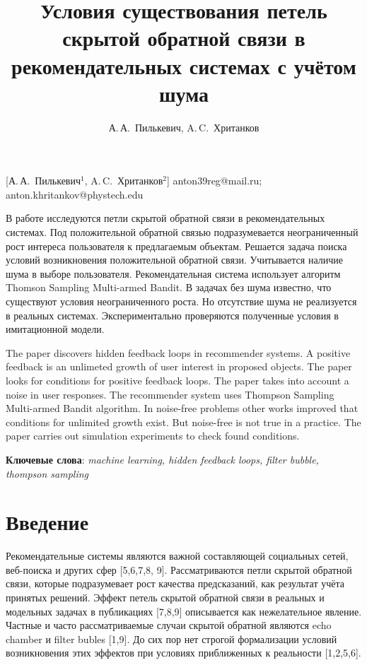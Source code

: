 \documentclass[12pt, twoside]{article}
\begin{document}
\title
    [] %
    {Условия существования петель скрытой обратной связи в рекомендательных системах с учётом шума}
\author
    [А.\,А.~Пилькевич] %
    {А.\,А.~Пилькевич, A.\,C.~Хританков} %
    [А.\,А.~Пилькевич$^1$, A.\,C.~Хританков$^2$] %
\email
   {anton39reg@mail.ru; anton.khritankov@phystech.edu}
\abstract
  {В работе исследуются петли скрытой обратной связи в рекомендательных системах.
  Под положительной обратной связью подразумевается неограниченный рост интереса пользователя к предлагаемым объектам. 
  Решается задача поиска условий возникновения положительной обратной связи. 
  Учитывается наличие шума в выборе пользователя.
  Рекомендательная система использует алгоритм Thomson Sampling Multi-armed Bandit.
  В задачах без шума известно, что существуют условия неограниченного роста. 
  Но отсутствие шума не реализуется в реальных системах.
  Экспериментально проверяются полученные условия в имитационной модели.

\bigskip
  The paper discovers hidden feedback loops in recommender systems. 
  A positive feedback is an unlimeted growth of user interest in proposed objects.
  The paper looks for conditions for positive feedback loops. 
  The paper takes into account a noise in user responses.
  The recommender system uses Thompson Sampling Multi-armed Bandit algorithm.
  In noise-free problems other works improved that conditions for unlimited growth exist.
  But noise-free is not true in a practice.
  The paper carries out simulation experiments to check found conditions.

\bigskip
\noindent
\textbf{Ключевые слова}: \emph {machine learning, hidden feedback loops, filter bubble, thompson sampling}
}
\doi{}
\receivedRus{}
\receivedEng{}

\maketitle
\linenumbers
\section{Введение}
Рекомендательные системы являются важной составляющей социальных сетей, веб-поиска и других сфер [5,6,7,8, 9]. 
Рассматриваются петли скрытой обратной связи, которые подразумевает рост качества предсказаний, как результат учёта принятых решений. 
Эффект петель скрытой обратной связи в реальных и модельных задачах в  публикациях [7,8,9] описывается как нежелательное явление. 
Частные и часто рассматриваемые случаи скрытой обратной являются echo chamber и filter bubles [1,9].
До сих пор нет строгой формализации условий возникновения этих эффектов при условиях приближенных к реальности [1,2,5,6]. 
\end{document}
